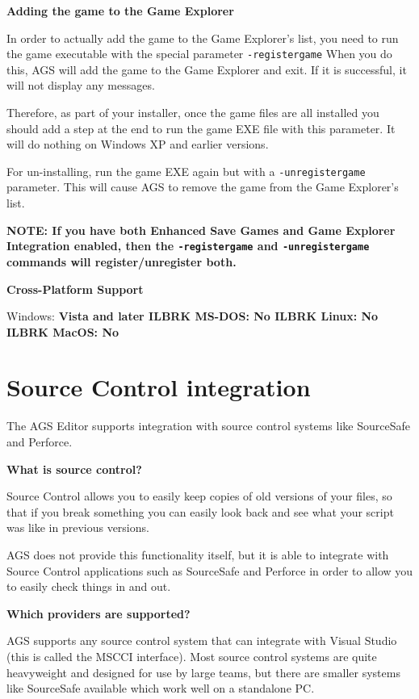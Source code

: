 \bf{Adding the game to the Game Explorer}

In order to actually add the game to the Game Explorer's list, you need to run the
game executable with the special parameter \verb$-registergame$  When you do this,
AGS will add the game to the Game Explorer and exit. If it is successful, it will
not display any messages.

Therefore, as part of your installer, once the game files are all installed you should
add a step at the end to run the game EXE file with this parameter. It will do nothing
on Windows XP and earlier versions.

For un-installing, run the game EXE again but with a  \verb$-unregistergame$  parameter.
This will cause AGS to remove the game from the Game Explorer's list.

\bf{NOTE:} If you have both Enhanced Save Games and Game Explorer Integration enabled,
then the \verb$-registergame$ and \verb$-unregistergame$ commands will register/unregister
both.

\bf{Cross-Platform Support}

Windows: \bf{ Vista and later }ILBRK
MS-DOS: \bf{ No }ILBRK
Linux: \bf{ No }ILBRK
MacOS: \bf{ No }


\section{Source Control integration}\label{SourceControl}%

The AGS Editor supports integration with source control systems like SourceSafe and Perforce.

\bf{What is source control?}

Source Control allows you to easily keep copies of old versions of your files, so that
if you break something you can easily look back and see what your script was like
in previous versions.

AGS does not provide this functionality itself, but it is able to integrate with
Source Control applications such as SourceSafe and Perforce in order to allow you
to easily check things in and out.

\bf{Which providers are supported?}

AGS supports any source control system that can integrate with Visual Studio
(this is called the MSCCI interface). Most source control systems are quite
heavyweight and designed for use by large teams, but there are smaller
systems like SourceSafe available which work well on a standalone PC.

